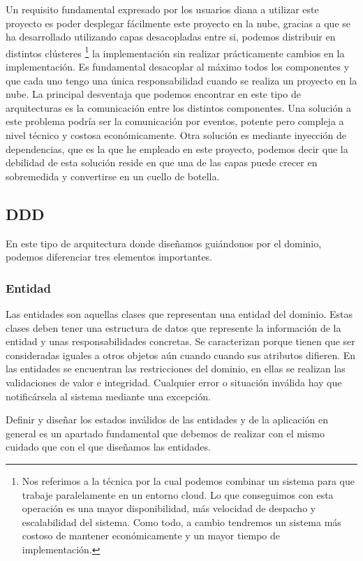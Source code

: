 Un requisito fundamental expresado por los usuarios diana a utilizar este proyecto es
poder desplegar fácilmente este proyecto en la nube, gracias a que se ha desarrollado
utilizando capas desacopladas entre si, podemos distribuir en distintos clústeres
\footnote{Nos referimos a la técnica por la cual podemos combinar un sistema para que
trabaje paralelamente en un entorno cloud. Lo que conseguimos con esta operación es una
mayor disponibilidad, más velocidad de despacho y escalabilidad del sistema. Como todo, a
cambio tendremos un sistema más costoso de mantener económicamente y un mayor tiempo de
implementación. } la implementación sin realizar prácticamente cambios en la
implementación.  Es fundamental desacoplar al máximo todos los componentes y que cada uno
tengo una única responsabilidad cuando se realiza un proyecto en la nube. La principal
desventaja que podemos encontrar en este tipo de arquitecturas es la comunicación entre
los distintos componentes.  Una solución a este problema podría ser la comunicación por
eventos, potente pero compleja a nivel técnico y costosa económicamente. Otra solución es
mediante inyección de dependencias, que es la que he empleado en este proyecto, podemos
decir que la debilidad de esta solución reside en que una de las capas puede crecer en
sobremedida y convertirse en un cuello de botella.



\subsection{DDD}
En este tipo de arquitectura donde diseñamos guiándonos por el dominio, podemos
diferenciar tres elementos importantes.

\subsubsection{Entidad}
Las entidades son aquellas clases que representan una entidad del dominio. Estas clases
deben tener una estructura de datos que represente la información de la entidad y unas
responsabilidades concretas. Se caracterizan porque tienen que ser consideradas iguales a
otros objetos aún cuando cuando sus atributos difieren. En las entidades se encuentran las
restricciones del dominio, en ellas se realizan las validaciones de valor e integridad.
Cualquier error o situación inválida hay que notificársela al sistema mediante una
excepción. 

Definir y diseñar los estados inválidos de las entidades y de la aplicación en general es
un apartado fundamental que debemos de realizar con el mismo cuidado que con el que
diseñamos las entidades.

